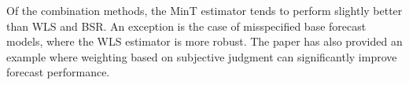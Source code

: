 \documentclass[a4paper,fleqn,11pt]{article}
\begin{document}
Of the combination methods, the MinT estimator tends to perform slightly better than WLS and BSR. An exception is the case of misspecified base forecast models, where the WLS estimator is more robust. The paper has also provided an example where weighting based on subjective judgment can significantly improve forecast performance. 




\clearpage

\setcounter{page}{3}



\clearpage



\end{document}
